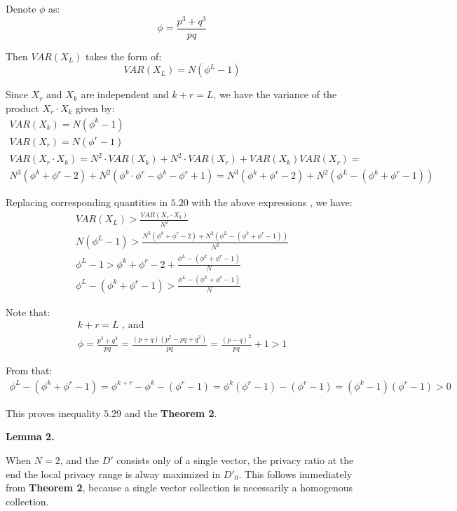 \documentclass[11pt,draft]{article}
\begin{document}
 Denote $\phi$ as:
 \[ \phi = \frac{p^3 + q^3}{pq} \]
 
 Then $VAR(X_L)$ takes the form of:
 \[ VAR(X_L) =  N(\phi^L - 1) \]
 
Since $X_r$ and $X_k$ are independent and $k+r=L$, we have the variance of the product  $X_r \cdot X_k$ given by:
 \begin{align}
VAR(X_k) =  N(\phi^k - 1) \\
VAR(X_r) =  N(\phi^r - 1) \\
VAR(X_r\cdot X_k) =  N^2 \cdot VAR(X_k) +  N^2 \cdot VAR(X_r) + VAR(X_k)VAR(X_r) = \\
N^3(\phi^k + \phi^r - 2) + N^2(\phi^k\cdot \phi^r - \phi^k - \phi^r + 1) = N^3(\phi^k + \phi^r - 2) + N^2(\phi^L - (\phi^k + \phi^r - 1))
 \end{align}
 
 Replacing corresponding quantities in  $5.20$ with the above expressions , we have:
 \begin{align}
VAR(X_L) >  \frac{VAR(X_r\cdot X_k)  }{N^2} \\
N(\phi^L - 1)  > \frac{ N^3(\phi^k + \phi^r - 2) + N^2(\phi^L - (\phi^k + \phi^r - 1)) }{ N^2 } \\
\phi^L - 1 > \phi^k + \phi^r - 2 + \frac{ \phi^L - (\phi^k + \phi^r - 1)} { N } \\
 \phi^L - (\phi^k + \phi^r - 1) >  \frac{ \phi^L - (\phi^k + \phi^r - 1) } { N } 
\end{align}

Note that:
\begin{align}
k + r = L \text { , and } \\
\phi = \frac{p^3 + q^3}{pq}  = \frac{(p+q)(p^2 - pq + q^2)}{pq} = \frac{(p-q)^2}{pq} + 1 > 1
\end{align}

From that:
\begin{align}
\phi^L - (\phi^k + \phi^r - 1)  = \phi^{k+r} - \phi^k - ( \phi^r - 1) = \phi^k(\phi^r-1) -   ( \phi^r - 1) = (\phi^k -1)( \phi^r - 1) > 0
 \end{align}

This proves inequality $5.29$ and the \textbf{Theorem 2}. 

\textbf{Lemma 2.}

When $N=2$, and the $D'$ consists only of a single vector, the privacy ratio at the end the local privacy range is alway maximized in $D'_0$.   This follows immediately from \textbf{Theorem 2}, because a single vector collection is necessarily a homogenous collection.
\end{document}
